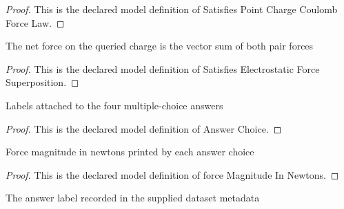 \begin{proof}
  This is the declared model definition of Satisfies Point Charge Coulomb Force Law.
\end{proof}
\begin{definition}
  \label{def:physics:phyx-mini-0896:phyxminiproblems-problemphyxmini0896-satisfieselectrostaticforcesuperposition}
  The net force on the queried charge is the vector sum of both pair forces
\end{definition}
\begin{proof}
  This is the declared model definition of Satisfies Electrostatic Force Superposition.
\end{proof}
\begin{definition}
  \label{def:physics:phyx-mini-0896:phyxminiproblems-problemphyxmini0896-answerchoice}
  Labels attached to the four multiple-choice answers
\end{definition}
\begin{proof}
  This is the declared model definition of Answer Choice.
\end{proof}
\begin{definition}
  \label{def:physics:phyx-mini-0896:phyxminiproblems-problemphyxmini0896-answerchoice-forcemagnitudeinnewtons}
  Force magnitude in newtons printed by each answer choice
\end{definition}
\begin{proof}
  This is the declared model definition of force Magnitude In Newtons.
\end{proof}
\begin{definition}
  \label{def:physics:phyx-mini-0896:phyxminiproblems-problemphyxmini0896-recordeddatasetanswer}
  The answer label recorded in the supplied dataset metadata
\end{definition}
